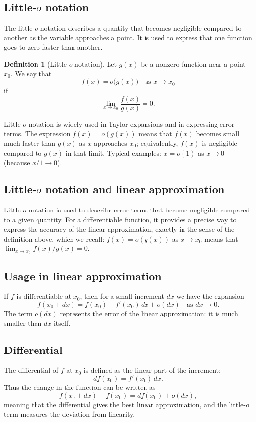 \documentclass[11pt,a4paper]{article}
\theoremstyle{definition} \newtheorem{definition}{Definition} \theoremstyle{plain} \newtheorem{theorem}{Theorem}
\begin{document}
\subsection{Little-\texorpdfstring{$o$}{o} notation}
The little-$o$ notation describes a quantity that becomes negligible compared to another as the variable approaches a point.
It is used to express that one function goes to zero faster than another.
\begin{definition}[Little-$o$ notation] Let $g(x)$ be a nonzero function near a point $x_0$.
We say that
\[ f(x) = o\bigl(g(x)\bigr) \quad \text{as } x \to x_0 \]
if
\[ \lim_{x\to x_0} \frac{f(x)}{g(x)} = 0. \]
\end{definition}
Little-$o$ notation is widely used in Taylor expansions and in expressing error terms. The expression $f(x) = o(g(x))$ means that $f(x)$ becomes small much faster than $g(x)$ as $x$ approaches $x_0$; equivalently, $f(x)$ is negligible compared to $g(x)$ in that limit. Typical examples: $x = o(1)$ as $x\to 0$ (because $x/1 \to 0$).
\subsection*{Little-$o$ notation and linear approximation}
Little-$o$ notation is used to describe error terms that become negligible compared to a given quantity.
For a differentiable function, it provides a precise way to express the accuracy of the linear approximation, exactly in the sense of the definition above, which we recall: $f(x)=o(g(x))$ as $x\to x_0$ means that $\lim_{x\to x_0} f(x)/g(x)=0$.
\subsection*{Usage in linear approximation}
If $f$ is differentiable at $x_0$, then for a small increment $dx$ we have the expansion
\[ f(x_0 + dx) = f(x_0) + f'(x_0)\,dx + o(dx) \quad \text{as } dx \to 0. \]
The term $o(dx)$ represents the error of the linear approximation: it is much smaller than $dx$ itself.
\subsection*{Differential}
The differential of $f$ at $x_0$ is defined as the linear part of the increment:
\[ df(x_0) = f'(x_0)\,dx. \]
Thus the change in the function can be written as
\[ f(x_0 + dx) - f(x_0) = df(x_0) + o(dx), \]
meaning that the differential gives the best linear approximation, and the little-$o$ term measures the deviation from linearity.
\end{document}
